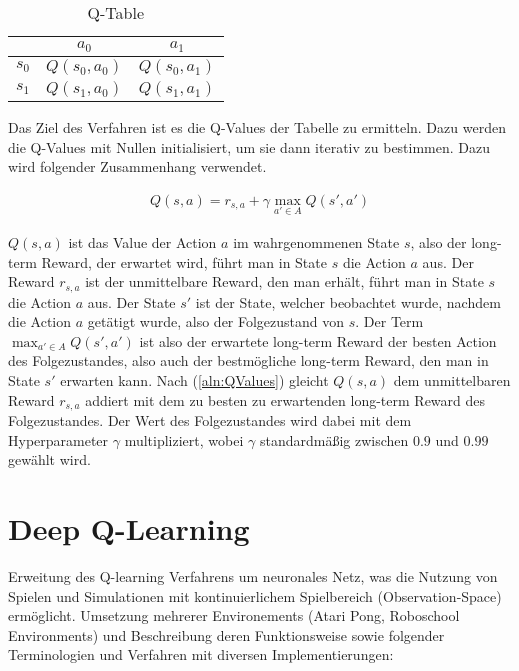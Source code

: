 \documentclass[11pt]{scrartcl}
\begin{document}
\begin{table}[h]
  \begin{center}
    \begin{tabular}{c | c | c}
       & $a_0$ & $a_1$ \\
      \hline
      $s_0$ & $Q(s_0, a_0)$ &$ Q(s_0, a_1)$ \\
      \hline
      $s_1$ & $Q(s_1, a_0)$ & $Q(s_1, a_1)$ \\
    \end{tabular}

    \caption[Q-Table]{Q-Table}
    \label{tab:q_table}
  \end{center}
\end{table}

\noindent
Das Ziel des Verfahren ist es die Q-Values der Tabelle zu ermitteln. Dazu werden die
Q-Values mit Nullen initialisiert, um sie dann iterativ zu bestimmen. Dazu wird folgender
Zusammenhang verwendet.

\begin{align}
Q(s, a) = r_{s,a} + \gamma \max_{a' \in A}Q(s', a')
\label{aln:QValues}
\end{align}

\noindent
$Q(s, a)$ ist das Value der Action $a$ im wahrgenommenen State $s$, also der long-term
Reward, der erwartet wird, führt man in State $s$ die Action $a$ aus. Der Reward $r_{s,a}$
ist der unmittelbare Reward, den man erhält, führt man in State $s$ die Action $a$ aus.
Der State $s'$ ist der State, welcher beobachtet wurde, nachdem die Action $a$ getätigt
wurde, also der Folgezustand von $s$. Der Term $\max_{a'\in A} Q(s', a')$ ist also der
erwartete long-term Reward der besten Action des Folgezustandes, also auch der
bestmögliche long-term Reward, den man in State $s'$ erwarten kann. Nach
(\ref{aln:QValues}) gleicht $Q(s, a)$ dem unmittelbaren Reward $r_{s,a}$ addiert mit dem
zu besten zu erwartenden long-term Reward des Folgezustandes. Der Wert des Folgezustandes
wird dabei mit dem Hyperparameter $\gamma$ multipliziert, wobei $\gamma$ standardmäßig
zwischen $0.9$ und $0.99$ gewählt wird.





\newpage
\section{Deep Q-Learning}
Erweitung des Q-learning Verfahrens um neuronales Netz, was die Nutzung von Spielen und
Simulationen mit kontinuierlichem Spielbereich (Observation-Space) ermöglicht. Umsetzung
mehrerer Environements (Atari Pong, Roboschool Environments) und Beschreibung deren
Funktionsweise sowie folgender Terminologien und Verfahren mit diversen Implementierungen:
\end{document}
